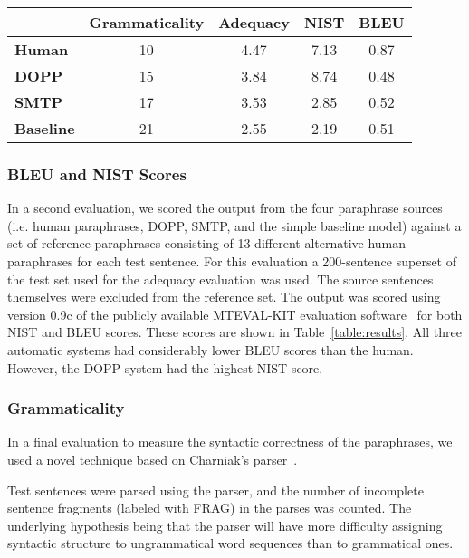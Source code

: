 \begin{table*}[ht]
\begin{center}
\begin{tabular}{l|c|c|c|c|}
&{\bf Grammaticality}&{\bf Adequacy}&{\bf NIST}&{\bf BLEU}\\
\hline
{\bf Human}&10&4.47&7.13&0.87\\
\hline
{\bf DOPP}&15&3.84&8.74&0.48\\
\hline
{\bf SMTP}&17&3.53&2.85&0.52\\
\hline
{\bf Baseline}&21&2.55&2.19&0.51\\
\hline
\end{tabular}
\end{center}
\caption{Experimental Results}
\label{table:results}
\end{table*}



\subsubsection{BLEU and NIST Scores}

In a second evaluation, we scored the output from the four paraphrase sources (i.e. human paraphrases, DOPP,
SMTP, and the simple baseline model) against a set of reference paraphrases consisting of 13 different
alternative human paraphrases for each test sentence. For this evaluation a 200-sentence superset of the test
set used for the adequacy evaluation was used.  The source sentences themselves were excluded from the reference
set. The output was scored using version 0.9c of the publicly available MTEVAL-KIT evaluation 
software~\cite{Doddington:02} 
for both NIST and BLEU scores.  These scores are shown in
Table~\ref{table:results}. All three automatic systems had considerably lower BLEU scores than the human.
However, the DOPP system had the highest NIST score. 



\subsubsection{Grammaticality}

In a final evaluation to measure the syntactic correctness of the paraphrases, we
used a novel technique based on Charniak's parser~\cite{charniak99maximumentropyinspired}.

Test sentences were parsed using the parser, and the number of incomplete sentence fragments (labeled with FRAG) in the parses was
counted. The underlying hypothesis being that the parser will have more difficulty
assigning syntactic structure to ungrammatical word sequences than to grammatical ones.

